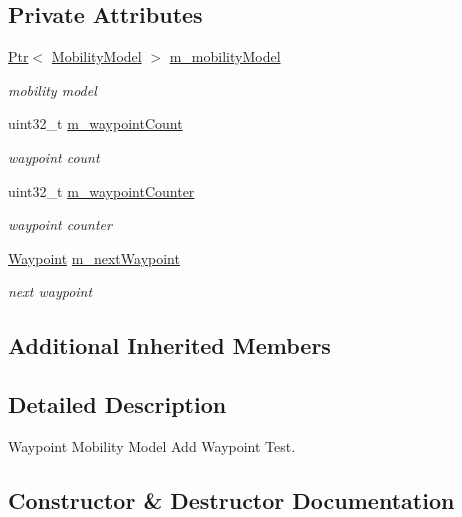 \subsection*{Private Attributes}
\begin{DoxyCompactItemize}
\item 
\hyperlink{classns3_1_1Ptr}{Ptr}$<$ \hyperlink{classns3_1_1MobilityModel}{Mobility\+Model} $>$ \hyperlink{classWaypointMobilityModelAddWaypointTest_a284c06ea80262b30a4f5670b6ae7e287}{m\+\_\+mobility\+Model}
\begin{DoxyCompactList}\small\item\em mobility model \end{DoxyCompactList}\item 
uint32\+\_\+t \hyperlink{classWaypointMobilityModelAddWaypointTest_a3db7a04e25567d5d432ff56c33195ba6}{m\+\_\+waypoint\+Count}
\begin{DoxyCompactList}\small\item\em waypoint count \end{DoxyCompactList}\item 
uint32\+\_\+t \hyperlink{classWaypointMobilityModelAddWaypointTest_a7e15fee40f671868d937ca440d71f5e1}{m\+\_\+waypoint\+Counter}
\begin{DoxyCompactList}\small\item\em waypoint counter \end{DoxyCompactList}\item 
\hyperlink{classns3_1_1Waypoint}{Waypoint} \hyperlink{classWaypointMobilityModelAddWaypointTest_ad6224f8ca856dc076d0f1c6c9b35b2ec}{m\+\_\+next\+Waypoint}
\begin{DoxyCompactList}\small\item\em next waypoint \end{DoxyCompactList}\end{DoxyCompactItemize}
\subsection*{Additional Inherited Members}


\subsection{Detailed Description}
Waypoint Mobility Model Add Waypoint Test. 

\subsection{Constructor \& Destructor Documentation}
